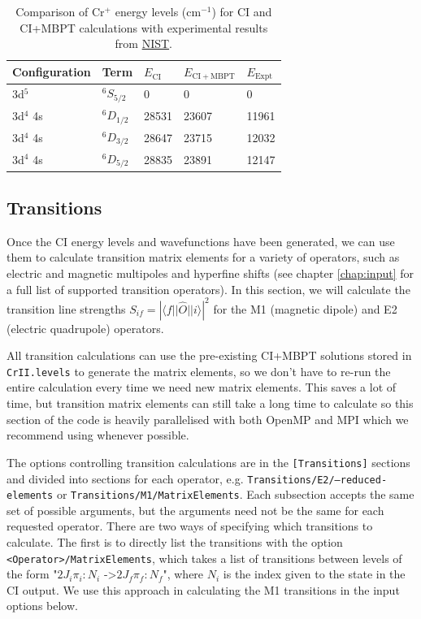 \documentclass{report}
\begin{document}
\begin{table}
\label{tab:CI_MBPT_comparison}
\caption{Comparison of Cr$^+$ energy levels (cm$^{-1}$) for CI and CI+MBPT calculations with experimental results
from \href{https://physics.nist.gov/PhysRefData/ASD/levels_form.html}{NIST}.
}
\begin{tabular}{l  l  l  l  l}
\hline
Configuration   &Term    &$E_{\mathrm{CI}}$  &$E_{\mathrm{CI+MBPT}}$ & $E_{\mathrm{Expt}}$\\
\hline
\hline
3d$^5$  &$^6S_{5/2}$    &0  &0  &0\\
3d$^4$ 4s   &$^6D_{1/2}$    & 28531 & 23607 &11961\\
3d$^4$ 4s   &$^6D_{3/2}$    & 28647 & 23715 &12032\\
3d$^4$ 4s   &$^6D_{5/2}$    & 28835 & 23891 &12147\\
\hline
\end{tabular}
\end{table}


\subsection{Transitions}

Once the CI energy levels and wavefunctions have been generated, we can use them to calculate transition
matrix elements for a variety of operators, such as electric and magnetic multipoles and hyperfine
shifts (see chapter \ref{chap:input} for a full list of supported transition operators). In this 
section, we will calculate the transition line strengths $S_{if} =
\left|\langle f||\hat{O}||i \rangle\right|^2$ for 
the M1 (magnetic dipole) and E2 (electric quadrupole) operators.

All transition calculations can use the pre-existing CI+MBPT solutions stored in \texttt{CrII.levels} to 
generate the matrix elements, so we don't have to re-run the entire calculation every time we need new
matrix elements. This saves a lot of time, but transition matrix elements can still take a long time to
calculate so this section of the code is heavily parallelised with both OpenMP and MPI which we
recommend using whenever possible.

The options controlling transition calculations are in the \texttt{[Transitions]} sections and divided
into sections for each operator, e.g. \texttt{Transitions/E2/--reduced-elements} or 
\texttt{Transitions/M1/MatrixElements}. Each subsection accepts the same set of possible arguments, but 
the arguments need not be the same for each requested operator. There are two ways of specifying which
transitions to calculate. The first is to directly list the transitions with the option
\texttt{<Operator>/MatrixElements}, which takes a list of transitions between levels of the form
"$2J_i\pi_i:N_i$ -\textgreater $2J_f\pi_f:N_f$", where $N_i$ is the index given to the state in the CI
output. We use this approach in calculating the M1 transitions in the input options below.
\end{document}
